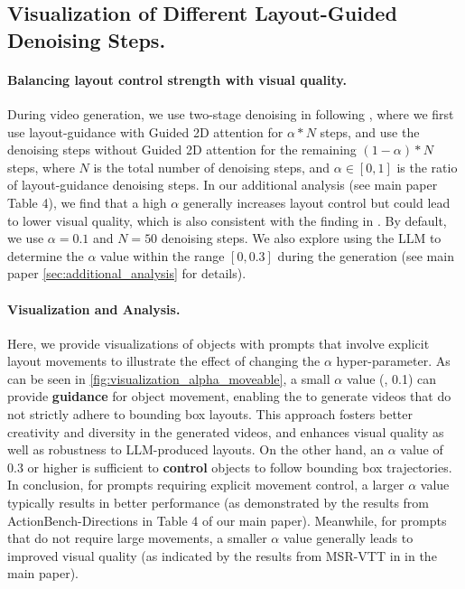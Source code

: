 \subsection{Visualization of Different Layout-Guided Denoising Steps.}\label{appendix:denoising_steps}
\paragraph{Balancing layout control strength with visual quality.}
During video generation,
we use two-stage denoising in \videomodule{} following \citet{li2023gligen},
where we first use layout-guidance with Guided 2D attention for $\alpha*N$ steps,
and use the denoising steps without Guided 2D attention for the remaining $(1-\alpha)*N$ steps, where $N$ is the total number of denoising steps, and $\alpha \in [0,1]$ is the ratio of layout-guidance denoising steps. In our additional analysis (see main paper Table 4), we find that a high $\alpha$ generally increases layout control but could lead to lower visual quality, which is also consistent with the finding in \citet{li2023gligen}.
By default, we use $\alpha=0.1$ and $N=50$ denoising steps.
We also explore using the LLM to determine the $\alpha$ value within the range $[0, 0.3]$ during the \videoplan{} generation
(see main paper \cref{sec:additional_analysis} for details).

\paragraph{Visualization and Analysis.} Here, we provide visualizations of objects with prompts that involve explicit layout movements to illustrate the effect of changing the $\alpha$ hyper-parameter. As can be seen in \cref{fig:visualization_alpha_moveable}, 
a small $\alpha$ value (\eg, 0.1) can provide \textbf{guidance} for object movement, enabling the \videomodule{} to generate videos that do not strictly adhere to bounding box layouts. This approach fosters better creativity and diversity in the generated videos, and enhances visual quality as well as robustness to LLM-produced layouts.
On the other hand, an $\alpha$ value of 0.3 or higher is sufficient to \textbf{control} objects to follow bounding box trajectories. 
In conclusion, for prompts requiring explicit movement control, a larger $\alpha$ value typically results in better performance (as demonstrated by the results from ActionBench-Directions in Table 4 of our main paper). Meanwhile, for prompts that do not require large movements, a smaller 
$\alpha$ value generally leads to improved visual quality (as indicated by the results from MSR-VTT in  in the main paper).



